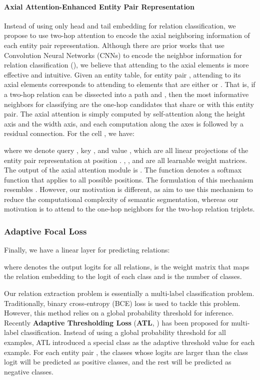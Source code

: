 \documentclass[11pt]{article}
\begin{document}
\paragraph{Axial Attention-Enhanced Entity Pair Representation} Instead of using only head and tail embedding for relation classification, we propose to use two-hop attention to encode the axial neighboring information of each entity pair  representation. Although there are prior works that use Convolution Neural Networks (CNNs) to encode the neighbor information for relation classification (\citealp{zhang2021document}), we believe that attending to the axial elements is more effective and intuitive. Given an  entity table, for entity pair , attending to its axial elements corresponds to attending to elements that are either  or . That is, if a two-hop relation  can be dissected into a path  and , then the most informative neighbors for classifying  are the one-hop candidates that share  or  with this entity pair. 
The axial attention is simply computed by self-attention along the height axis and the width axis, and each computation along the axes is followed by a residual connection. For the cell , we have:

where we denote query , key , and value , which are all linear projections of the entity pair representation  at position . , , and  are all learnable weight matrices. The output of the axial attention module is . The  function denotes a softmax function that applies to all possible  positions. The formulation of this mechanism resembles \citet{wang2020axial}. However, our motivation is different, as \citet{wang2020axial} aim to use this mechanism to reduce the computational complexity of semantic segmentation, whereas our motivation is to attend to the one-hop neighbors for the two-hop relation triplets. 
 


\subsubsection{Adaptive Focal Loss}



Finally, we have a linear layer for predicting relations:

where  denotes the output logits for all relations,  is the weight matrix that maps the relation embedding to the logit of each class and  is the number of classes. 

Our relation extraction problem is essentially a multi-label classification problem. Traditionally, binary cross-entropy (BCE) loss is used to tackle this problem. However, this method relies on a global probability threshold for inference. Recently \textbf{Adaptive Thresholding Loss} (\textbf{ATL}, \citealp{zhou2021document}) has been proposed for multi-label classification. Instead of using a global probability threshold for all examples, ATL introduced a special class  as the adaptive threshold value for each example. For each entity pair , the classes whose logits are larger than the  class logit will be predicted as positive classes, and the rest will be predicted as negative classes. 
\end{document}
